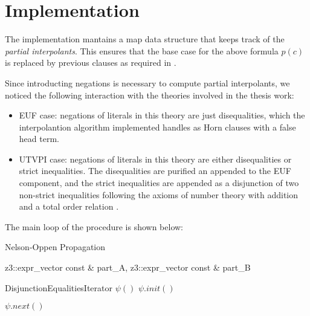 \section{Implementation}

The implementation mantains a map data structure that 
keeps track of the \emph{partial interpolants}. This ensures
that the base case for the above formula $p(c)$ is replaced
by previous clauses as required in \cite{10.1007/11532231_26}.

Since introducting negations is necessary to compute partial interpolants,
we noticed the following interaction with the theories involved in the
thesis work:

\begin{itemize}
  \item EUF case: negations of literals in this theory are just
    disequalities, which the interpolantion algorithm implemented
    handles as Horn clauses with a false head term.
  \item UTVPI case: negations of literals in this theory are either
    disequalities or strict inequalities. The disequalities are purified
    an appended to the EUF component, and the strict inequalities are 
    appended as a disjunction of two non-strict inequalities following
    the axioms of number theory with addition and a total order relation
    \cite{DBLP:books/daglib/0076838}.
\end{itemize}

The main loop of the procedure is shown below:

\begin{algorithm}[!ht]
  \caption{ Nelson-Oppen Propagation }
  \linespread{\separationline}\selectfont
  \begin{algorithmic}[2]
     { 
      z3::expr\_vector const \& part\_A, 
      z3::expr\_vector const \& part\_B 
  }


    \State DisjunctionEqualitiesIterator $\psi()$
    \State $\psi.init()$

    \EndIf
    \EndIf


    \Else
    \EndIf

    \Else

    \Else
    \EndIf

    \EndIf

    \State $\psi.next()$

    \EndWhile

    \EndProcedure
  \end{algorithmic}
\end{algorithm}

